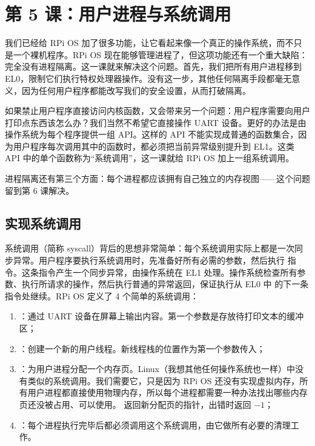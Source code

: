 \section{第 5 课：用户进程与系统调用}
\label{sec:rpios-l5}

我们已经给 RPi OS 加了很多功能，让它看起来像一个真正的操作系统，而不只是一个裸机程序。RPi OS 现在能够管理进程了，但这项功能还有一个重大缺陷：完全没有进程隔离。这一课就来解决这个问题。首先，我们把所有用户进程移到 EL0，限制它们执行特权处理器操作。没有这一步，其他任何隔离手段都毫无意义，因为任何用户程序都能改写我们的安全设置，从而打破隔离。

如果禁止用户程序直接访问内核函数，又会带来另一个问题：用户程序需要向用户打印点东西该怎么办？我们当然不希望它直接操作 UART 设备。更好的办法是由操作系统为每个程序提供一组 API。这样的 API 不能实现成普通的函数集合，因为用户程序每次调用其中的函数时，都必须把当前异常级别提升到 EL1。这类 API 中的单个函数称为“系统调用”，这一课就给 RPi OS 加上一组系统调用。

进程隔离还有第三个方面：每个进程都应该拥有自己独立的内存视图——这个问题留到第 6 课解决。

\subsection{实现系统调用}

系统调用（简称 syscall）背后的思想非常简单：每个系统调用实际上都是一次同步异常。用户程序要执行系统调用时，先准备好所有必需的参数，然后执行  指令。这条指令产生一个同步异常，由操作系统在 EL1 处理。操作系统检查所有参数、执行所请求的操作，然后执行普通的异常返回，保证执行从 EL0 中  的下一条指令处继续。RPi OS 定义了 4 个简单的系统调用：

\begin{enumerate}
  \item {}：通过 UART 设备在屏幕上输出内容。第一个参数是存放待打印文本的缓冲区；
  \item {}：创建一个新的用户线程。新线程栈的位置作为第一个参数传入；
  \item {}：为用户进程分配一个内存页。Linux（我想其他任何操作系统也一样）中没有类似的系统调用。我们需要它，只是因为 RPi OS 还没有实现虚拟内存，所有用户进程都直接使用物理内存，所以每个进程都需要一种办法找出哪些内存页还没被占用、可以使用。 返回新分配页的指针，出错时返回 $-1$；
  \item {}：每个进程执行完毕后都必须调用这个系统调用，由它做所有必要的清理工作。
\end{enumerate}

